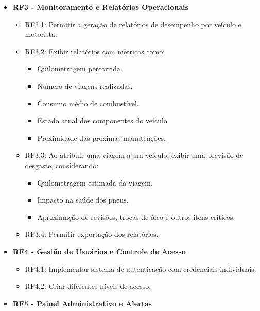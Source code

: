 \documentclass[12pt]{article}
\begin{document}
\begin{itemize}
    \item \textbf{RF3 - Monitoramento e Relatórios Operacionais}

    \begin{itemize}
        \item RF3.1: Permitir a geração de relatórios de desempenho por veículo e motorista.
        \item RF3.2: Exibir relatórios com métricas como:
        \begin{itemize}
            \item Quilometragem percorrida.
            \item Número de viagens realizadas.
            \item Consumo médio de combustível.
            \item Estado atual dos componentes do veículo.
            \item Proximidade das próximas manutenções.
        \end{itemize}
        \item RF3.3: Ao atribuir uma viagem a um veículo, exibir uma previsão de desgaste, considerando:
        \begin{itemize}
            \item Quilometragem estimada da viagem.
            \item Impacto na saúde dos pneus.
            \item Aproximação de revisões, trocas de óleo e outros itens críticos.
        \end{itemize}
        \item RF3.4: Permitir exportação dos relatórios.
    \end{itemize}

    \item \textbf{RF4 - Gestão de Usuários e Controle de Acesso}

    \begin{itemize}
        \item RF4.1: Implementar sistema de autenticação com credenciais individuais.
        \item RF4.2: Criar diferentes níveis de acesso.
    \end{itemize}

    \item \textbf{RF5 - Painel Administrativo e Alertas}


\end{itemize}
\end{document}
